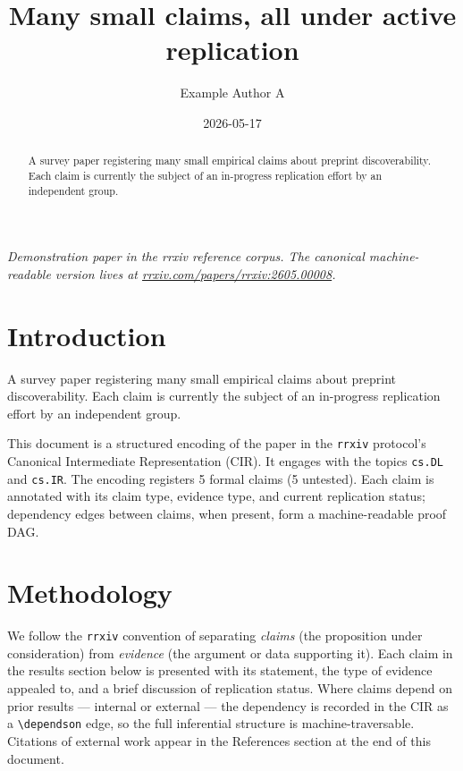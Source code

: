 \documentclass{rrxiv}
\title{Many small claims, all under active replication}
\author{Example Author A}
\date{2026-05-17}
\begin{document}
\maketitle

\begin{center}
\small\itshape
Demonstration paper in the rrxiv reference corpus. The canonical machine-readable version lives at \href{https://rrxiv.com/papers/rrxiv:2605.00008}{rrxiv.com/papers/rrxiv:2605.00008}.
\end{center}

\begin{abstract}
A survey paper registering many small empirical claims about preprint discoverability. Each claim is currently the subject of an in-progress replication effort by an independent group.
\end{abstract}

\section{Introduction}
A survey paper registering many small empirical claims about preprint discoverability. Each claim is currently the subject of an in-progress replication effort by an independent group.

This document is a structured encoding of the paper in the \texttt{rrxiv} protocol's Canonical Intermediate Representation (CIR). It engages with the topics \texttt{cs.DL} and \texttt{cs.IR}. The encoding registers 5 formal claims (5 untested). Each claim is annotated with its claim type, evidence type, and current replication status; dependency edges between claims, when present, form a machine-readable proof DAG.

\section{Methodology}
We follow the \texttt{rrxiv} convention of separating \emph{claims} (the proposition under consideration) from \emph{evidence} (the argument or data supporting it). Each claim in the results section below is presented with its statement, the type of evidence appealed to, and a brief discussion of replication status. Where claims depend on prior results --- internal or external --- the dependency is recorded in the CIR as a \texttt{\textbackslash dependson} edge, so the full inferential structure is machine-traversable. Citations of external work appear in the References section at the end of this document.
\end{document}
